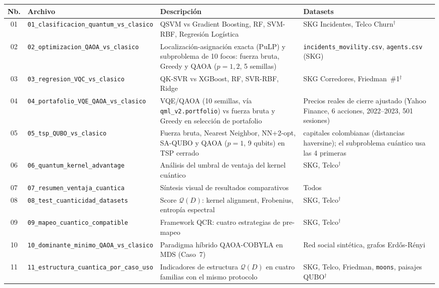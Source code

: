 \begin{table}[ht]
\centering
\footnotesize
\setlength{\tabcolsep}{4pt}
\renewcommand{\arraystretch}{1.1}
\begin{tabularx}{\linewidth}{@{}c >{\raggedright\arraybackslash}p{4.2cm} >{\raggedright\arraybackslash}X >{\raggedright\arraybackslash}p{3.4cm}@{}}
\toprule
\textbf{Nb.} & \textbf{Archivo} & \textbf{Descripción} & \textbf{Datasets} \\
\midrule
01 & \nolinkurl{01_clasificacion_quantum_vs_clasico} & QSVM vs Gradient Boosting, RF, SVM-RBF, Regresión Logística & SKG Incidentes, Telco Churn$^\dagger$ \\[1pt]
02 & \nolinkurl{02_optimizacion_QAOA_vs_clasico} & Localización-asignación exacta (PuLP) y subproblema de 10 focos: fuerza bruta, Greedy y QAOA ($p=1,2$, 5 semillas) & \texttt{incidents\_\allowbreak movility.csv}, \texttt{agents.csv} (SKG) \\[1pt]
03 & \nolinkurl{03_regresion_VQC_vs_clasico} & QK-SVR vs XGBoost, RF, SVR-RBF, Ridge & SKG Corredores, Friedman~\#1$^\dagger$ \\[1pt]
04 & \nolinkurl{04_portafolio_VQE_QAOA_vs_clasico} & VQE/QAOA (10 semillas, vía \texttt{qml\_v2.portfolio}) vs fuerza bruta y Greedy en selección de portafolio & Precios reales de cierre ajustado (Yahoo Finance, 6 acciones, 2022--2023, 501 sesiones) \\[1pt]
05 & \nolinkurl{05_tsp_QUBO_vs_clasico} & Fuerza bruta, Nearest Neighbor, NN+2-opt, SA-QUBO y QAOA ($p=1$, 9 qubits) en TSP cerrado & 12 capitales colombianas (distancias haversine); el subproblema cuántico usa las 4 primeras \\[1pt]
06 & \nolinkurl{06_quantum_kernel_advantage} & Análisis del umbral de ventaja del kernel cuántico & SKG, Telco$^\dagger$ \\[1pt]
07 & \nolinkurl{07_resumen_ventaja_cuantica} & Síntesis visual de resultados comparativos & Todos \\[1pt]
08 & \nolinkurl{08_test_cuanticidad_datasets} & Score $\mathcal{Q}(D)$: kernel alignment, Frobenius, entropía espectral & SKG, Telco$^\dagger$ \\[1pt]
09 & \nolinkurl{09_mapeo_cuantico_compatible} & Framework QCR: cuatro estrategias de pre-mapeo & SKG, Telco$^\dagger$ \\[1pt]
10 & \nolinkurl{10_dominante_minimo_QAOA_vs_clasico} & Paradigma híbrido QAOA-COBYLA en MDS (Caso~7) & Red social sintética, grafos Erdős-Rényi \\[1pt]
11 & \nolinkurl{11_estructura_cuantica_por_caso_uso} & Indicadores de estructura $\mathcal{Q}(D)$ en cuatro familias con el mismo protocolo & SKG, Telco, Friedman, \texttt{moons}, paisajes QUBO$^\dagger$ \\[1pt]

\end{tabularx}
\end{table}
